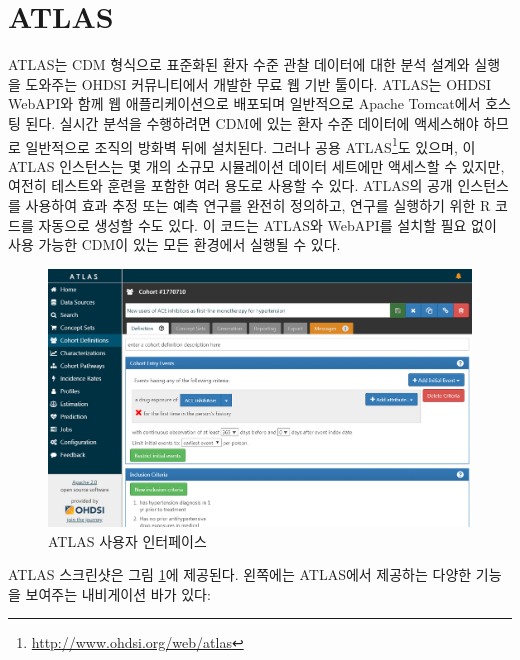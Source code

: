 \documentclass[10.5pt]{book}
\let\rmarkdownfootnote\footnote%
\def\footnote{\protect\rmarkdownfootnote}
\theoremstyle{definition}
\theoremstyle{definition}
\theoremstyle{definition}
\theoremstyle{remark}
\begin{document}
\section{ATLAS}\label{atlas}

ATLAS는 CDM 형식으로 표준화된 환자 수준 관찰 데이터에 대한 분석 설계와
실행을 도와주는 OHDSI 커뮤니티에서 개발한 무료 웹 기반 툴이다. ATLAS는
OHDSI WebAPI와 함께 웹 애플리케이션으로 배포되며 일반적으로 Apache
Tomcat에서 호스팅 된다. 실시간 분석을 수행하려면 CDM에 있는 환자 수준
데이터에 액세스해야 하므로 일반적으로 조직의 방화벽 뒤에 설치된다.
그러나 공용 ATLAS\footnote{\url{http://www.ohdsi.org/web/atlas}}도
있으며, 이 ATLAS 인스턴스는 몇 개의 소규모 시뮬레이션 데이터 세트에만
액세스할 수 있지만, 여전히 테스트와 훈련을 포함한 여러 용도로 사용할 수
있다. ATLAS의 공개 인스턴스를 사용하여 효과 추정 또는 예측 연구를 완전히
정의하고, 연구를 실행하기 위한 R 코드를 자동으로 생성할 수도 있다. 이
코드는 ATLAS와 WebAPI를 설치할 필요 없이 사용 가능한 CDM이 있는 모든
환경에서 실행될 수 있다. 

\begin{figure}

{\centering \includegraphics[width=1\linewidth]{images/OhdsiAnalyticsTools/atlas} 

}

\caption{ATLAS 사용자 인터페이스}\label{fig:atlas}
\end{figure}

ATLAS 스크린샷은 그림 \ref{fig:atlas}에 제공된다. 왼쪽에는 ATLAS에서
제공하는 다양한 기능을 보여주는 내비게이션 바가 있다:
\end{document}
